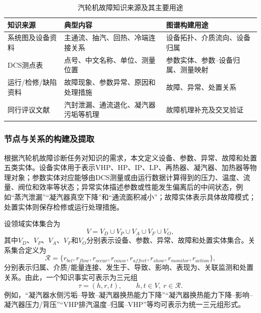 \begin{table}[htbp]
    \centering
    \caption{汽轮机故障知识来源及其主要用途}
    \label{tab:kg_sources_v3}
    \begin{tabular}{p{}p{}p{}}
        \toprule
        知识来源 & 典型内容 & 图谱构建用途 \\
        \midrule
        系统图及设备资料 & 主通流、抽汽、回热、冷端连接关系 & 设备拓扑、介质流向、设备归属 \\
        DCS测点表 & 点号、中文名称、单位、测量位置 & 参数实体、参数--设备归属、测量映射 \\
        运行/检修/缺陷资料 & 故障现象、参数异常、原因和处理措施 & 故障、异常、处置关系 \\
        同行评议文献 & 汽封泄漏、通流退化、凝汽器污垢等机理 & 故障机理补充及交叉验证 \\
        \bottomrule
    \end{tabular}
\end{table}

\subsubsection{节点与关系的构建及提取}

根据汽轮机故障诊断任务对知识的需求，本文定义设备、参数、异常、故障和处置五类实体。设备实体用于表示VHP、HP、IP、LP、再热器、凝汽器、加热器等物理对象；参数实体对应能够由DCS测量或由运行数据计算得到的压力、温度、流量、阀位和效率等状态；异常实体描述参数或性能发生偏离后的中间状态，例如“蒸汽泄漏”“凝汽器真空下降”和“通流面积减小”；故障实体表示具体故障模式；处置实体则保存检修或运行处理措施。

设领域实体集合为
\begin{equation}
    V=V_D\cup V_P\cup V_A\cup V_F\cup V_O,
\end{equation}
其中$V_D$、$V_P$、$V_A$、$V_F$和$V_O$分别表示设备、参数、异常、故障和处置实体集合。关系集合定义为
\begin{equation}
    \mathcal R=\{r_{bel},r_{flow},r_{occur},r_{cause},r_{affect},r_{show},r_{monitor},r_{action}\},
\end{equation}
分别表示归属、介质/能量连接、发生于、导致、影响、表现为、关联监测和处置关系。由此，一个知识事实可表示为三元组
\begin{equation}
    \tau=(h,r,t),\qquad h,t\in V,\ r\in\mathcal R.
\end{equation}
例如，“凝汽器水侧污垢--导致--凝汽器换热能力下降”“凝汽器换热能力下降--影响--凝汽器压力/背压”“VHP排汽温度--归属--VHP”等均可表示为统一三元组形式。

